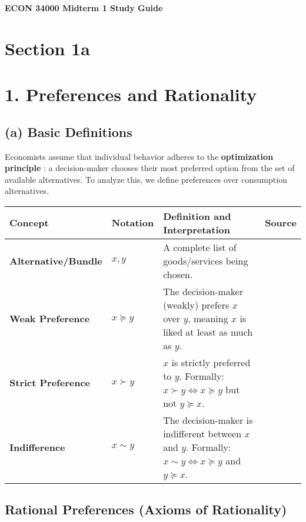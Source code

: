 \documentclass{article}
\begin{document}
\begin{center}
    {\Huge \textbf{ECON 34000 Midterm 1 Study Guide}}
\end{center}

\section*{Section 1a}

\section*{1. Preferences and Rationality}

\subsection*{ (a) Basic Definitions}

Economists assume that individual behavior adheres to the \textbf{optimization principle} : a decision-maker chooses their most preferred option from the set of available alternatives. To analyze this, we define preferences over consumption alternatives.

\begin{center}
\begin{tabular}{>{\bfseries}l l p{11cm} l}
\toprule
\textbf{Concept} & \textbf{Notation} & \textbf{Definition and Interpretation} & \textbf{Source} \\
\midrule
Alternative/Bundle & $x, y$ & A complete list of goods/services being chosen. & \\
Weak Preference & $x \succeq y$ & The decision-maker (weakly) prefers $x$ over $y$, meaning $x$ is liked at least as much as $y$. & \\
Strict Preference & $x \succ y$ & $x$ is strictly preferred to $y$. Formally: $x \succ y \iff x \succeq y$ but not $y \succeq x$. & \\
Indifference & $x \sim y$ & The decision-maker is indifferent between $x$ and $y$. Formally: $x \sim y \iff x \succeq y$ and $y \succeq x$. & \\
\bottomrule

\end{tabular}

\end{center}

\subsection*{Rational Preferences (Axioms of Rationality)}
\end{document}

